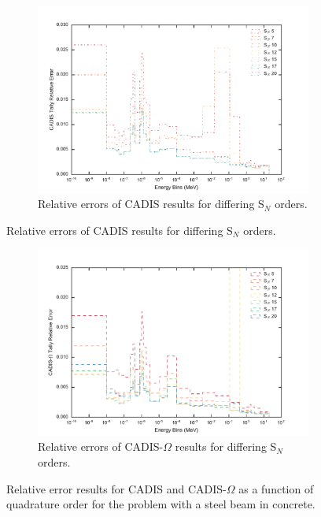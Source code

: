 \begin{figure}[htb!]
  \centering
  \begin{subfigure}[t]{\textwidth}
    \centering
    \includegraphics[width=\linewidth]{./chapters/characterization_probs/figures/angle/prob_1/err_quad_cadis.pdf}
    \caption{Relative errors of CADIS results for differing S$_N$ orders.}
    \label{fig:sn_cad_err}
  \end{subfigure}
\end{figure}
\begin{figure}[htb!]\ContinuedFloat
  \centering
  \begin{subfigure}[t]{\textwidth}
    \centering
    \includegraphics[width=\linewidth]{./chapters/characterization_probs/figures/angle/prob_1/err_quad_cadisangle.pdf}
    \caption{Relative errors of CADIS-$\Omega$ results for differing S$_N$
    orders.}
    \label{fig:sn_cadangle_err}
  \end{subfigure}
  \caption[Relative error results for CADIS and CADIS-$\Omega$ as a function of
  quadrature order for the problem with a steel beam in concrete.]
  {Relative error results for CADIS and CADIS-$\Omega$ as a function of
  quadrature order for the problem with a steel beam in concrete.}
\end{figure}


